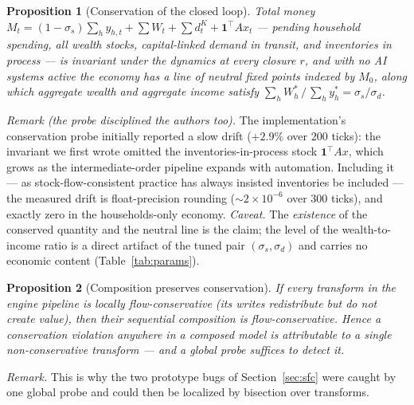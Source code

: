 \documentclass[11pt]{article}
\newtheorem{proposition}{Proposition}
\begin{document}
\begin{proposition}[Conservation of the closed loop]\label{prop:conserve}
Total money
$M_t = (1-\sigma_s)\sum_h y_{h,t} + \sum W_t + \sum d^{K}_t
+ \mathbf{1}^{\top}A x_t$
--- pending household spending, all wealth stocks, capital-linked demand in
transit, and \emph{inventories in process} --- is invariant under the
dynamics at every closure $r$, and with no AI systems active the economy has
a line of neutral fixed points indexed by $M_0$, along which aggregate
wealth and aggregate income satisfy
$\sum_h W_{h}^{*} \,/\, \sum_h y_{h}^{*} = \sigma_s/\sigma_d$.
\end{proposition}
\noindent\emph{Remark (the probe disciplined the authors too).} The
implementation's conservation probe initially reported a slow drift
($+2.9\%$ over 200 ticks): the invariant we first wrote omitted the
inventories-in-process stock $\mathbf{1}^{\top}Ax$, which grows as the
intermediate-order pipeline expands with automation. Including it --- as
stock-flow-consistent practice has always insisted inventories be included
--- the measured drift is float-precision rounding ($\sim 2\times 10^{-6}$
over 300 ticks), and exactly zero in the households-only economy.
\noindent\emph{Caveat.} The \emph{existence} of the conserved quantity and
the neutral line is the claim; the level of the wealth-to-income ratio is a
direct artifact of the tuned pair $(\sigma_s, \sigma_d)$ and carries no
economic content (Table~\ref{tab:params}).

\begin{proposition}[Composition preserves conservation]\label{prop:compose}
If every transform in the engine pipeline is locally flow-conservative (its
writes redistribute but do not create value), then their sequential
composition is flow-conservative. Hence a conservation violation anywhere in
a composed model is attributable to a single non-conservative transform ---
and a global probe suffices to detect it.
\end{proposition}
\noindent\emph{Remark.} This is why the two prototype bugs of
Section~\ref{sec:sfc} were caught by one global probe and could then be
localized by bisection over transforms.
\end{document}
